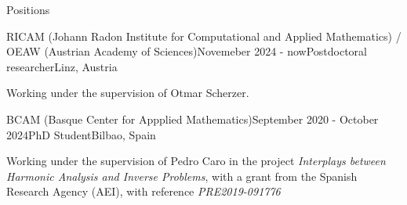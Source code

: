 \documentclass{resume} %
\begin{document}


\begin{rSection}{Positions}

    \begin{rSubsection}{RICAM (Johann Radon Institute for Computational and Applied Mathematics) / OEAW (Austrian Academy of Sciences)}{Novemeber 2024 - now}{Postdoctoral researcher}{Linz, Austria}
        \item Working under the supervision of Otmar Scherzer.
    \end{rSubsection}
    \begin{rSubsection}{BCAM (Basque Center for Appplied Mathematics)}{September 2020 - October 2024}{PhD Student}{Bilbao, Spain}
        \item Working under the supervision of Pedro Caro in the project \textit{Interplays between Harmonic Analysis and Inverse Problems}, with a grant from the Spanish Research Agency (AEI), with reference \textit{PRE2019-091776}
    \end{rSubsection}
  
    
\end{rSection}


\end{document}
